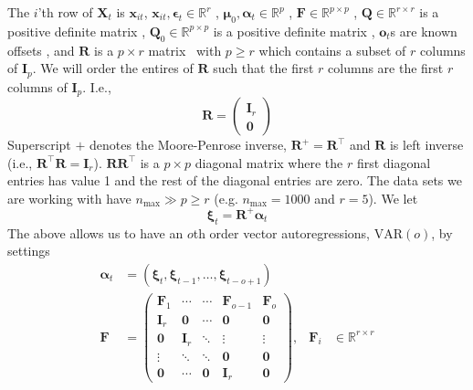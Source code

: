 \documentclass[notitlepage]{article}
\renewcommand{\vec}[1]{\bm{#1}}
\newcommand{\mat}[1]{\mathbf{#1}}
\newcommand{\Lparen}[1]{\left( #1\right)}
\newcommand{\optor}[2]{#1\Lparen{#2}}
\newcommand{\dimState}{p}
\newcommand{\dimRng}{r}
\newcommand{\nMax}{n_{\text{max}}}
\newcommand\MVAR[1]{\optor{\text{VAR}}{#1}}
\begin{document}
The $i$'th row of $\mat{X}_t$ is $\vec{x}_{it}$, $\vec{x}_{it},\vec{\epsilon}_t\in\mathbb{R}^\dimRng$%
, $\vec\mu_0,\vec{\alpha}_t\vec\in\mathbb{R}^\dimState$%
, $\mat{F} \in \mathbb{R}^{\dimState\times\dimState}$%
, $\mat{Q} \in \mathbb{R}^{\dimRng\times\dimRng}$ is a positive definite matrix%
, $\mat{Q}_0 \in \mathbb{R}^{\dimState\times\dimState}$ is a positive definite matrix%
, $\vec{o}_t$s are known offsets%
, and $\mat{R}$ is a $\dimState\times\dimRng$ matrix%
~with $\dimState\geq\dimRng$ which contains a subset of $r$ columns of $\mat{I}_{\dimState}$. We will order the entires of $\mat R$ such that the first $\dimRng$ columns are the 
first $\dimRng$ columns of $\mat{I}_{\dimState}$. I.e.,%
%
$$\mat{R} = \begin{pmatrix}
	\mat I_\dimRng  \\
	\mat 0 
\end{pmatrix}$$%
%
Superscript $+$ denotes the Moore-Penrose inverse, $\mat{R}^+ = \mat{R}^\top$ and $\mat{R}$ is left inverse (i.e., $\mat{R}^\top\mat{R} = \mat{I}_\dimRng$). $\mat{R}\mat{R}^\top$ is a $\dimState\times\dimState$ diagonal matrix where the $\dimRng$ 
first diagonal entries has value 1 and the rest of the diagonal entries are zero. 
The data sets we are working with have 
$\nMax \gg \dimState \geq \dimRng$ (e.g. $\nMax = 1000$ and $\dimRng = 5$). We let %
%
$$\vec{\xi}_{t} = \mat{R}^{+}\vec{\alpha}_t$$%
%
The above allows us to have an $o$th order vector autoregressions, $\MVAR{o}$, by settings%
%
\begin{align*}
\vec\alpha_t &= (\vec\xi_t,\vec\xi_{t-1},\dots, \vec\xi_{t - o + 1}) \\
\mat F &= \begin{pmatrix}
 \mat F_1    & \cdots & \cdots & \mat F_{o-1} & \mat F_o \\
 \mat I_\dimRng    & \mat 0      & \cdots & \mat 0 & \mat 0 \\
 \mat 0      &  \mat I_\dimRng    & \ddots & \vdots & \vdots \\
 \vdots & \ddots & \ddots & \mat 0 & \mat 0 \\
 \mat 0      & \cdots & \mat 0 & \mat I_\dimRng & \mat 0 
\end{pmatrix}, & \mat F_i &\in \mathbb{R}^{\dimRng\times\dimRng}
\end{align*}
\end{document}

